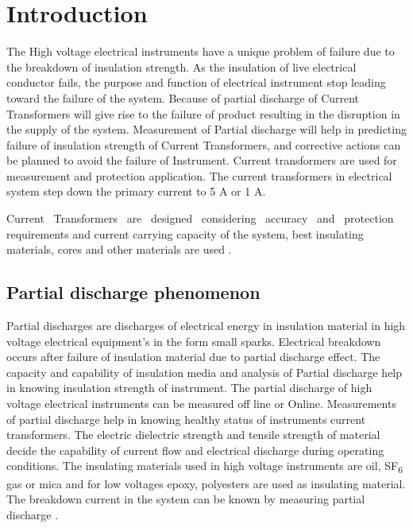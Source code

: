 
\section{Introduction}
\justify The High voltage electrical instruments have a unique problem of failure due to the breakdown of insulation strength. As the insulation of live electrical conductor fails, the purpose and function of electrical instrument stop leading toward the failure of the system. Because of partial discharge of Current Transformers will give rise to the failure of product resulting in the disruption in the supply of the system. Measurement of Partial discharge will help in predicting failure of insulation strength of Current Transformers, and corrective actions can be planned to avoid the failure of Instrument. Current transformers are used for measurement and protection application. The current transformers in electrical system step down the primary current to 5 A or 1 A. \setlength{\parskip}{1em}

Current ~Transformers ~are ~designed ~considering ~accuracy ~and ~protection requirements and current carrying capacity of the system, best insulating materials, cores and other materials are used \setlength{\parskip}{0em} \cite{crichton1989partial}.

\subsection{Partial discharge phenomenon}
Partial discharges are discharges of electrical energy in insulation material in high voltage electrical equipment's in the form small sparks. Electrical breakdown occurs after failure of insulation material due to partial discharge effect. The capacity and capability of insulation media and analysis of Partial discharge help in knowing insulation strength of instrument. The partial discharge of high voltage electrical instruments can be measured off line or Online. Measurements of partial discharge help in knowing healthy status of instruments current transformers. The electric dielectric strength and tensile strength of material decide the capability of current flow and electrical discharge during operating conditions. The insulating materials used in high voltage instruments are oil, SF\textsubscript{6} gas or mica and for low voltages epoxy, polyesters are used as insulating material. The breakdown current in the system can be known by measuring partial discharge \cite{van1994physics, danikas1998some, paithankar1997can}.\setlength{\parskip}{1em}

